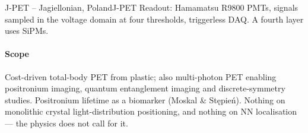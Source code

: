 \begin{programnote}{J-PET -- Jagiellonian, Poland}{J-PET}
Readout: Hamamatsu R9800 PMTs, signals sampled in the voltage domain at four
thresholds, triggerless DAQ.  A fourth layer uses
SiPMs.
 
\paragraph{Scope}
Cost-driven total-body PET from plastic; also multi-photon PET enabling
positronium imaging, quantum entanglement imaging and discrete-symmetry studies.
Positronium lifetime as a biomarker (Moskal \& Stępień). Nothing on monolithic
crystal light-distribution positioning, and nothing on NN localisation ---
the physics does not call for it.
 
 
\end{programnote}
 
 
 
